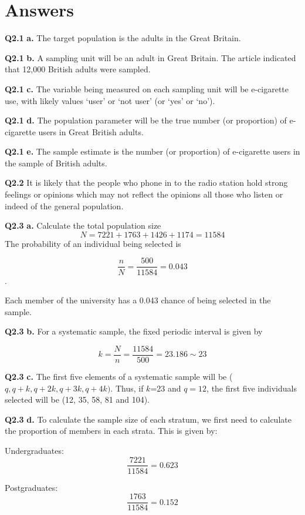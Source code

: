\documentclass[
  oneside]{krantz}
\begin{document}
\hypertarget{ANSsamp}{%
\section{Answers}\label{ANSsamp}}

\textbf{Q2.1} \textbf{a.} The target population is the adults in the Great Britain.

\textbf{Q2.1} \textbf{b.} A sampling unit will be an adult in Great Britain. The article indicated that 12,000 British adults were sampled.

\textbf{Q2.1} \textbf{c.} The variable being measured on each sampling unit will be e-cigarette use, with likely values `user' or `not user' (or `yes' or `no').

\textbf{Q2.1} \textbf{d.} The population parameter will be the true number (or proportion) of e-cigarette users in Great British adults.

\textbf{Q2.1} \textbf{e.} The sample estimate is the number (or proportion) of e-cigarette users in the sample of British adults.

\textbf{Q2.2} It is likely that the people who phone in to the radio station hold strong feelings or opinions which may not reflect the opinions all those who listen or indeed of the general population.

\textbf{Q2.3} \textbf{a.} Calculate the total population size
\[ N = 7221 + 1763 + 1426 + 1174 = 11584\]
The probability of an individual being selected is

\[ \frac{n}{N} = \frac{500}{11584} = 0.043\].

Each member of the university has a 0.043 chance of being selected in the sample.

\textbf{Q2.3} \textbf{b.} For a systematic sample, the fixed periodic interval is given by

\[k = \frac{N}n = \frac{11584}{500} = 23.186 \sim 23\]

\textbf{Q2.3} \textbf{c.} The first five elements of a systematic sample will be (\(q, q+k, q+2k, q+3k, q+4k)\). Thus, if \(k\)=23 and \(q=12\), the first five individuals selected will be (12, 35, 58, 81 and 104).

\textbf{Q2.3} \textbf{d.} To calculate the sample size of each stratum, we first need to calculate the proportion of members in each strata. This is given by:

Undergraduates: \[\frac{7221}{11584} = 0.623 \]

Postgraduates: \[\frac{1763}{11584} = 0.152 \]
\end{document}
